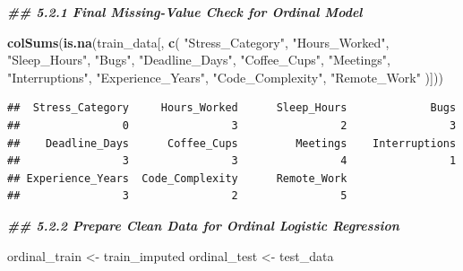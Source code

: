 \documentclass[
]{article}
\newenvironment{Shaded}{\begin{snugshade}}{\end{snugshade}}
\newcommand{\DocumentationTok}[1]{\textcolor[rgb]{0.56,0.35,0.01}{\textbf{\textit{#1}}}}
\newcommand{\FunctionTok}[1]{\textcolor[rgb]{0.13,0.29,0.53}{\textbf{#1}}}
\newcommand{\NormalTok}[1]{#1}
\newcommand{\OtherTok}[1]{\textcolor[rgb]{0.56,0.35,0.01}{#1}}
\newcommand{\StringTok}[1]{\textcolor[rgb]{0.31,0.60,0.02}{#1}}
\begin{document}
\begin{Shaded}
\begin{Highlighting}[]
\DocumentationTok{\#\# 5.2.1 Final Missing{-}Value Check for Ordinal Model}

\FunctionTok{colSums}\NormalTok{(}\FunctionTok{is.na}\NormalTok{(train\_data[, }\FunctionTok{c}\NormalTok{(}
  \StringTok{"Stress\_Category"}\NormalTok{,}
  \StringTok{"Hours\_Worked"}\NormalTok{,}
  \StringTok{"Sleep\_Hours"}\NormalTok{,}
  \StringTok{"Bugs"}\NormalTok{,}
  \StringTok{"Deadline\_Days"}\NormalTok{,}
  \StringTok{"Coffee\_Cups"}\NormalTok{,}
  \StringTok{"Meetings"}\NormalTok{,}
  \StringTok{"Interruptions"}\NormalTok{,}
  \StringTok{"Experience\_Years"}\NormalTok{,}
  \StringTok{"Code\_Complexity"}\NormalTok{,}
  \StringTok{"Remote\_Work"}
\NormalTok{)]))}
\end{Highlighting}
\end{Shaded}

\begin{verbatim}
##  Stress_Category     Hours_Worked      Sleep_Hours             Bugs 
##                0                3                2                3 
##    Deadline_Days      Coffee_Cups         Meetings    Interruptions 
##                3                3                4                1 
## Experience_Years  Code_Complexity      Remote_Work 
##                3                2                5
\end{verbatim}

\begin{Shaded}
\begin{Highlighting}[]
\DocumentationTok{\#\# 5.2.2 Prepare Clean Data for Ordinal Logistic Regression}

\NormalTok{ordinal\_train }\OtherTok{\textless{}{-}}\NormalTok{ train\_imputed}
\NormalTok{ordinal\_test  }\OtherTok{\textless{}{-}}\NormalTok{ test\_data}
\end{Highlighting}
\end{Shaded}
\end{document}
